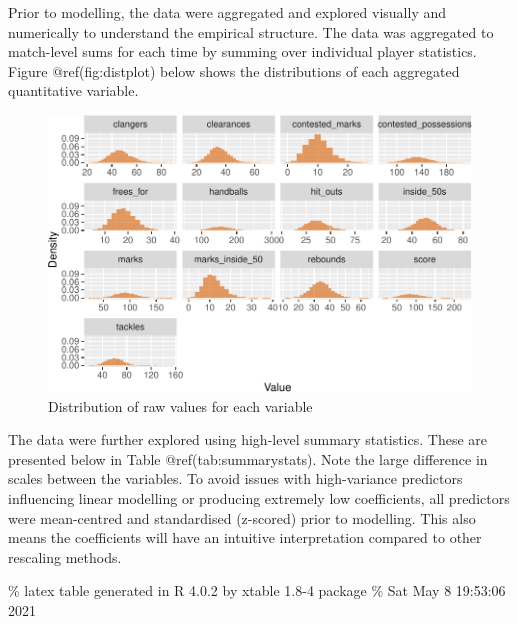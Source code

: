 \documentclass{article}
\begin{document}
Prior to modelling, the data were aggregated and explored visually and
numerically to understand the empirical structure. The data was
aggregated to match-level sums for each time by summing over individual
player statistics. Figure @ref(fig:distplot) below shows the
distributions of each aggregated quantitative variable.

\begin{figure}
\centering
\includegraphics{OLET5608_TrentHenderson_files/figure-latex/distplot-1.pdf}
\caption{Distribution of raw values for each variable}
\end{figure}

The data were further explored using high-level summary statistics.
These are presented below in Table @ref(tab:summarystats). Note the
large difference in scales between the variables. To avoid issues with
high-variance predictors influencing linear modelling or producing
extremely low coefficients, all predictors were mean-centred and
standardised (z-scored) prior to modelling. This also means the
coefficients will have an intuitive interpretation compared to other
rescaling methods.

\% latex table generated in R 4.0.2 by xtable 1.8-4 package \% Sat May 8
19:53:06 2021
\end{document}
